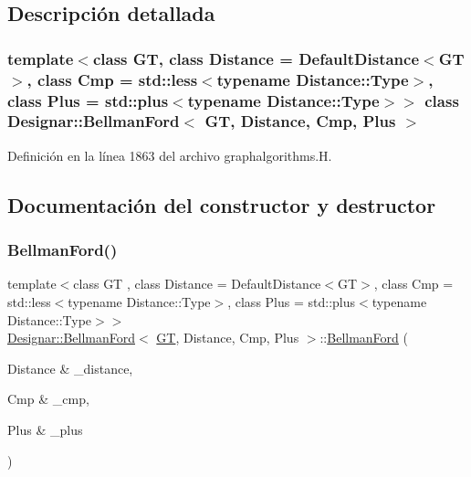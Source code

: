 \subsection{Descripción detallada}
\subsubsection*{template$<$class GT, class Distance = Default\+Distance$<$\+G\+T$>$, class Cmp = std\+::less$<$typename Distance\+::\+Type$>$, class Plus = std\+::plus$<$typename Distance\+::\+Type$>$$>$\newline
class Designar\+::\+Bellman\+Ford$<$ G\+T, Distance, Cmp, Plus $>$}



Definición en la línea 1863 del archivo graphalgorithms.\+H.



\subsection{Documentación del constructor y destructor}
\mbox{\label{class_designar_1_1_bellman_ford_adb2ea922dfd109d977cb85a5a10873ae}} 
\subsubsection{\texorpdfstring{Bellman\+Ford()}{BellmanFord()}\hspace{0.1cm}{\footnotesize\ttfamily [1/2]}}
{\footnotesize\ttfamily template$<$class GT , class Distance  = Default\+Distance$<$\+G\+T$>$, class Cmp  = std\+::less$<$typename Distance\+::\+Type$>$, class Plus  = std\+::plus$<$typename Distance\+::\+Type$>$$>$ \\
\hyperlink{class_designar_1_1_bellman_ford}{Designar\+::\+Bellman\+Ford}$<$ \hyperlink{demo-buildgraph_8_c_a3001c40d2c31ca87ed96cd7d1334a55e}{GT}, Distance, Cmp, Plus $>$\+::\hyperlink{class_designar_1_1_bellman_ford}{Bellman\+Ford} (\begin{DoxyParamCaption}\item[{Distance \&}]{\+\_\+distance,  }\item[{Cmp \&}]{\+\_\+cmp,  }\item[{Plus \&}]{\+\_\+plus }\end{DoxyParamCaption})\hspace{0.3cm}{\ttfamily [inline]}}



